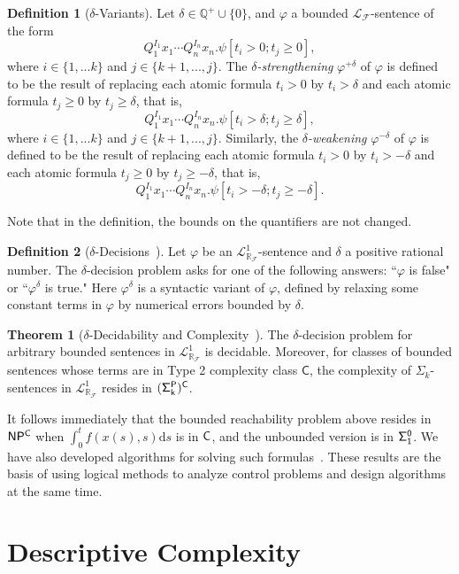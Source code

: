 \documentclass[10pt]{article}
\newcommand{\lrf}{\mathcal{L}_{\mathbb{R}_{\mathcal{F}}}}
\theoremstyle{definition}
\newtheorem{definition}{Definition}
\newtheorem{theorem}{Theorem}
\begin{document}
\begin{definition}[$\delta$-Variants]
Let $\delta\in \mathbb{Q}^+\cup\{0\}$, and $\varphi$ a bounded $\mathcal{L}_{\mathcal{F}}$-sentence of the form
$$Q_1^{I_1}x_1\cdots Q_n^{I_n}x_n.\psi[t_i>0; t_j\geq 0],$$
where $i\in\{1,...k\}$ and $j\in\{k+1,...,j\}$. The {\em $\delta$-strengthening} $\varphi^{+\delta}$ of $\varphi$ is defined to be the result of replacing each atomic formula $t_i > 0$ by $t_i > \delta$ and each atomic formula $t_j \geq 0$ by $t_j \geq \delta$, that is,
$$Q_1^{I_1}x_1\cdots Q_n^{I_n}x_n.\psi[t_i>\delta; t_j\geq \delta],$$
where $i\in\{1,...k\}$ and $j\in\{k+1,...,j\}$.
Similarly, the {\em $\delta$-weakening} $\varphi^{-\delta}$ of $\varphi$ is defined to be the result of replacing each atomic formula $t_i > 0$ by $t_i > -\delta$ and each atomic formula $t_j \geq 0$ by $t_j \geq -\delta$, that is,
$$Q_1^{I_1}x_1\cdots Q_n^{I_n}x_n.\psi[t_i>-\delta; t_j\geq -\delta].$$
\end{definition}
Note that in the definition, the bounds on the quantifiers are not changed. 
\begin{definition}[$\delta$-Decisions~\cite{DBLP:conf/lics/GaoAC12}] Let $\varphi$ be an $\lrf^1$-sentence and $\delta$ a positive rational number. The $\delta$-decision problem asks for one of the following answers: ``$\varphi$ is false" or ``$\varphi^{\delta}$ is true." Here $\varphi^{\delta}$ is a syntactic variant of $\varphi$, defined by relaxing some constant terms in $\varphi$ by numerical errors bounded by $\delta$. 
\end{definition}
\begin{theorem}[$\delta$-Decidability and Complexity~\cite{DBLP:conf/lics/GaoAC12}] The $\delta$-decision problem for arbitrary bounded sentences in $\lrf^1$ is decidable. Moreover, for classes of bounded sentences whose terms are in Type 2 complexity class $\mathsf{C}$, the complexity of $\Sigma_k$-sentences in $\lrf^1$ resides in ${\sf (\Sigma^P_k)^C}$. 
\end{theorem}
It follows immediately that the bounded reachability problem above resides in ${\sf NP^C}$ when $\int_{0}^t f(x(s),s)\mathrm{d}s$ is in ${\sf C}$, and the unbounded version is in ${\sf \Sigma^0_1}$. We have also developed algorithms for solving such formulas~\cite{DBLP:conf/fmcad/GaoKC13}. These results are the basis of using logical methods to analyze control problems and design algorithms at the same time. 


\section{Descriptive Complexity}
\end{document}
